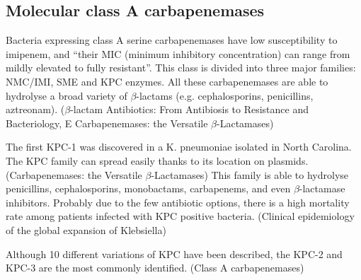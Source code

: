 \documentclass[11pt]{report}
\begin{document}
\subsection{Molecular class A carbapenemases}
Bacteria expressing class A serine carbapenemases have low susceptibility to imipenem, and “their MIC (minimum inhibitory concentration) can range from mildly elevated to fully resistant”. This class is divided into three major families: NMC/IMI, SME and KPC enzymes.
All these carbapenemases are able to hydrolyse a broad variety of $\beta$-lactams (e.g. cephalosporins, penicillins, aztreonam).
($\beta$-lactam Antibiotics: From Antibiosis to Resistance and Bacteriology, E Carbapenemases: the Versatile $\beta$-Lactamases)

The first KPC-1 was discovered in a K. pneumoniae isolated  in North Carolina. The KPC family can spread easily thanks to its location on plasmids.
(Carbapenemases: the Versatile $\beta$-Lactamases)
This family is able to hydrolyse penicillins, cephalosporins, monobactams, carbapenems, and even $\beta$-lactamase inhibitors. Probably due to the few antibiotic options, there is a high mortality rate among patients infected with KPC positive bacteria.
(Clinical epidemiology of the global expansion of Klebsiella)
                   
Although 10 different variations of KPC have been described, the KPC-2 and KPC-3 are the most commonly identified. (Class A carbapenemases)



































\end{document}

